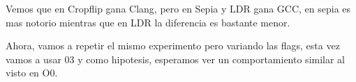 \begin{figure}[H]
    \centering
    \begin{floatrow}
    \end{floatrow}
\end{figure}

Vemos que en Cropflip gana Clang, pero en Sepia y LDR gana GCC, en sepia es mas notorio mientras que en LDR la diferencia es bastante menor.


Ahora, vamos a repetir el mismo experimento pero variando las flags, esta vez vamos a usar 03 y como hipotesis, esperamos ver un comportamiento similar al visto en O0.
\begin{figure}[H]
    \centering
    \begin{floatrow}
    \end{floatrow}
\end{figure}


